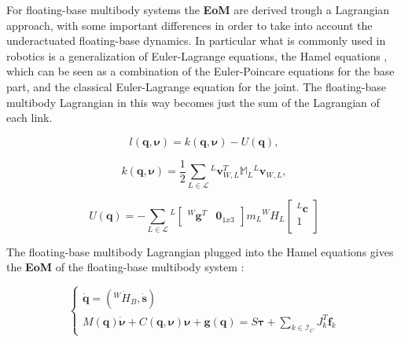     For floating-base multibody systems the \textbf{EoM} are derived trough a Lagrangian approach, with some important differences in order to take into account the underactuated floating-base dynamics.
    In particular what is commonly used in robotics is a generalization of Euler-Lagrange equations, the Hamel equations \cite{Marsden-et-al.}, which can be seen as a combination of the Euler-Poincare equations for the base part, and the classical Euler-Lagrange equation for the joint.
    The floating-base multibody Lagrangian in this way becomes just the sum of the Lagrangian of each link.

    \begin{equation*}
         l( \mathbf{q},\bm{\nu}) = k( \mathbf{q},\bm{\nu}) - U( \mathbf{q}) ,
    \end{equation*}

    \begin{equation*}
         k( \mathbf{q},\bm{\nu}) = \frac{1}{2}\sum_{L \in \mathcal{L}} {}^{L}  \mathbf{v}^{T}_{W,L}\mathbb{M}_L{}^{L}  \mathbf{v}_{W,L},
    \end{equation*}

    \begin{equation*}
         U( \mathbf{q}) = -\sum_{L \in \mathcal{L}} {}^{L} \begin{bmatrix}
             {}^{W} \mathbf{g}^{T} & \bm{0}_{1x3}
         \end{bmatrix} m_L {}^{W} {H}_L \begin{bmatrix}
             {}^{L}{ \mathbf{c}} \\
             1 \\
         \end{bmatrix}
    \end{equation*}

   The floating-base multibody Lagrangian plugged into the Hamel equations gives the \textbf{EoM} of the floating-base multibody system \cite{Traversaro2017thesis}:

   \begin{equation}
         \begin{cases}
          \dot{ \mathbf{q}} = ({}^{W}\dot{ {H}}_{B}, \dot{ \mathbf{s}}) \\
          M( \mathbf{q})\dot{\bm{\nu}} + C( \mathbf{q},\bm{\nu})\bm{\nu} +  \mathbf{g}( \mathbf{q}) = S\bm{\tau} + \sum_{k \in \mathcal{I}_C} J^{T}_{k} \mathbf{f}_{k}
         \end{cases} 
    \label{eq: Equation of Motion}
    \end{equation}

